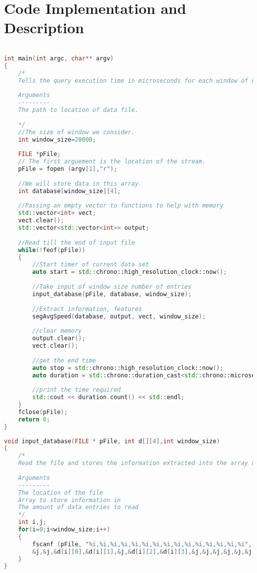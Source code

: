 \chapter{Code Implementation and Description}
\label{appendix}
\thispagestyle{myheadings}

\begin{lstlisting}[language=C++, caption= code overview for simple query, label={lst:simple_query_overview}]

int main(int argc, char** argv)
{
    /*
    Tells the query execution time in microseconds for each window of data.
    
    Arguments
    ---------
    The path to location of data file.
    
    */
    //The size of window we consider.
    int window_size=20000;
    
    FILE *pFile;
    // The first arguement is the location of the stream.
    pFile = fopen (argv[1],"r");
    
    //We will store data in this array.
    int database[window_size][4];
    
    //Passing an empty vector to functions to help with memory
    std::vector<int> vect;
    vect.clear();
    std::vector<std::vector<int>> output;
    
    //Read till the end of input file
    while(!feof(pFile))
    {
        //Start timer of current data set
        auto start = std::chrono::high_resolution_clock::now();
        
        //Take input of window size number of entries
        input_database(pFile, database, window_size);
        
        //Extract information, features
        segAvgSpeed(database, output, vect, window_size);
        
        //clear memory
        output.clear();
        vect.clear();
        
        //get the end time 
        auto stop = std::chrono::high_resolution_clock::now(); 
        auto duration = std::chrono::duration_cast<std::chrono::microseconds>(stop - start);
        
        //print the time required
        std::cout << duration.count() << std::endl;
    }
    fclose(pFile);
    return 0;
}
\end{lstlisting}

\begin{lstlisting}[language=C++, caption= File reading function for simple query, label={lst:simple_query_input}]
void input_database(FILE * pFile, int d[][4],int window_size)
{
    /*
    Read the file and stores the information extracted into the array d.
    
    Arguments
    ---------
    The location of the file
    Array to store information in
    The amount of data entries to read
    */
    int i,j;
    for(i=0;i<window_size;i++)
    {
        fscanf (pFile, "%i,%i,%i,%i,%i,%i,%i,%i,%i,%i,%i,%i,%i,%i,%i", &j,
        &j,&j,&d[i][0],&d[i][1],&j,&d[i][2],&d[i][3],&j,&j,&j,&j,&j,&j,&j);
    }
}
\end{lstlisting}

